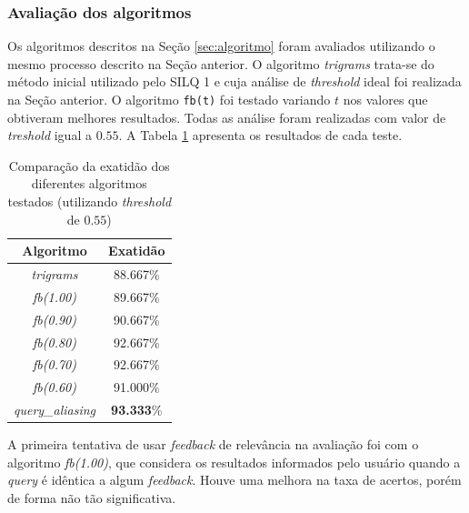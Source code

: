 \documentclass[12pt]{article}
\begin{document}
\subsubsection{Avaliação dos algoritmos} \label{sec:avaliacao-algoritmos}

Os algoritmos descritos na Seção \ref{sec:algoritmo} foram avaliados utilizando o mesmo processo descrito na Seção anterior. O algoritmo \textit{trigrams} trata-se do método inicial utilizado pelo SILQ 1 e cuja análise de \textit{threshold} ideal foi realizada na Seção anterior. O algoritmo \texttt{fb(t)} foi testado variando $t$ nos valores que obtiveram melhores resultados. Todas as análise foram realizadas com valor de \textit{treshold} igual a $0.55$. A Tabela \ref{tab:comparacao-algoritmos} apresenta os resultados de cada teste.

\begin{table}[!h]
\begin{center}
\caption{Comparação da exatidão dos diferentes algoritmos testados (utilizando \textit{threshold} de $0.55$)}
\label{tab:comparacao-algoritmos}
\begin{tabular}{ c | c }
\hline
\textbf{Algoritmo} & \textbf{Exatidão} \\
\hline

\textit{trigrams} & 88.667\% \\
\textit{fb(1.00)} & 89.667\% \\
\textit{fb(0.90)} & 90.667\% \\
\textit{fb(0.80)} & 92.667\% \\
\textit{fb(0.70)} & 92.667\% \\
\textit{fb(0.60)} & 91.000\% \\
\textit{query\_aliasing} & \textbf{93.333}\% \\

\end{tabular}
\end{center}
\end{table}

A primeira tentativa de usar \textit{feedback} de relevância na avaliação foi com o algoritmo \textit{fb(1.00)}, que considera os resultados informados pelo usuário quando a \textit{query} é idêntica a algum \textit{feedback}. Houve uma melhora na taxa de acertos, porém de forma não tão significativa.
\end{document}
